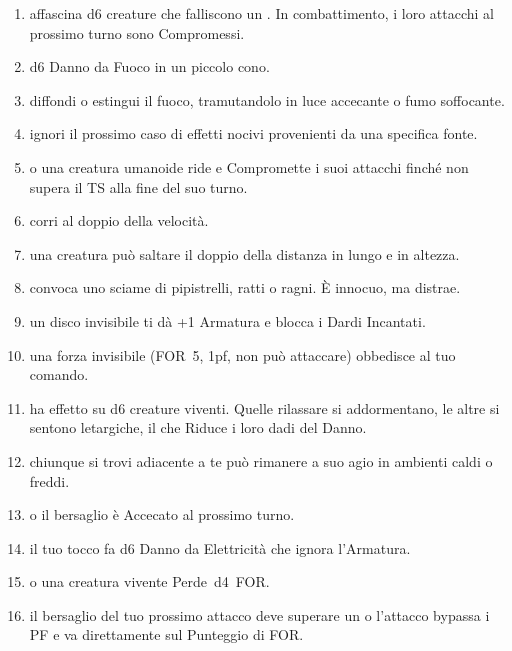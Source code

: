 \documentclass[itdr]{subfiles}
\begin{document}
\begin{enumerate}
	\item {} affascina d6 creature che falliscono un . In combattimento, i loro attacchi al prossimo turno sono Compromessi.
	\item {} d6 Danno da Fuoco in un piccolo cono.
	\item {} diffondi o estingui il fuoco, tramutandolo in luce accecante o fumo soffocante.
	\item {} ignori il prossimo caso di effetti nocivi provenienti da una specifica fonte.
	\item {}  o una creatura umanoide ride e Compromette i suoi attacchi finché non supera il TS alla fine del suo turno.
	\item {} corri al doppio della velocità.
	\item {} una creatura può saltare il doppio della distanza in lungo e in altezza.
	\item {} convoca uno sciame di pipistrelli, ratti o ragni. È innocuo, ma distrae.
	\item {} un disco invisibile ti dà +1 Armatura e blocca i Dardi Incantati.
	\item {} una forza invisibile (FOR~5, 1pf, non può attaccare) obbedisce al tuo comando.
	\item {} ha effetto su d6 creature viventi. Quelle rilassare si addormentano, le altre si sentono letargiche, il che Riduce i loro dadi del \mbox{Danno}.
	\item {} chiunque si trovi adiacente a te può rimanere a suo agio in ambienti caldi o freddi.
	\item {}  o il bersaglio è Accecato al prossimo turno.
	\item {} il tuo tocco fa d6 \mbox{Danno} da Elettricità che ignora l’Armatura.
	\item {}  o una creatura vivente Perde~d4~FOR.
	\item {} il bersaglio del tuo prossimo attacco deve superare un  o l’attacco bypassa i PF e va direttamente sul Punteggio di FOR.
\end{enumerate}


\vfill
\break
\end{document}
